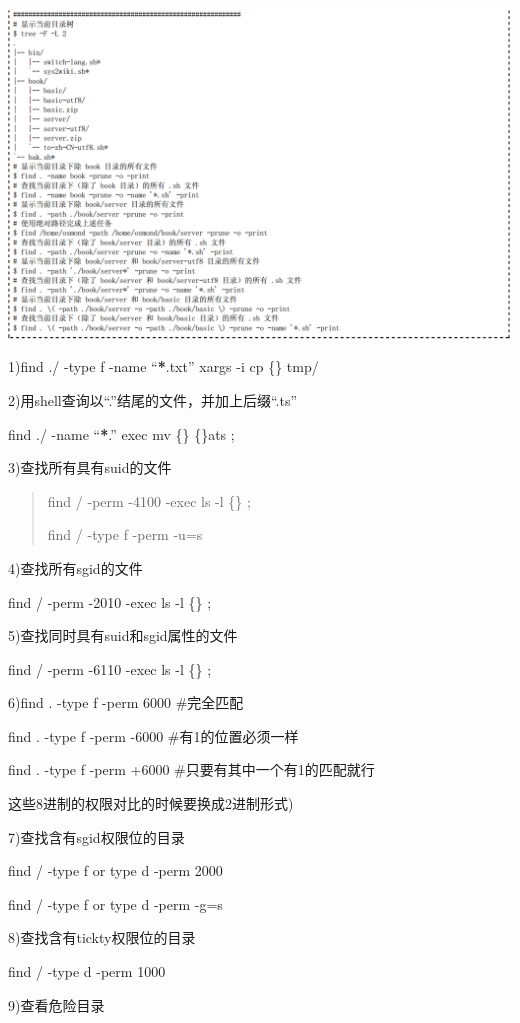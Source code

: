 \documentclass[letterpaper,10pt]{sphinxmanual}
\begin{document}
\includegraphics{eg7.png}

1)find ./ -type f -name ``{\color{red}\bfseries{}*}.txt'' {\color{red}\bfseries{}\textbar{}}xargs -i cp \{\} tmp/

2)用shell查询以“.”结尾的文件，并加上后缀“.ts”

find ./ -name ``{\color{red}\bfseries{}*}.'' exec mv \{\} \{\}ats ;

3)查找所有具有suid的文件
\begin{quote}

find / -perm -4100 -exec ls -l \{\} ;

find / -type f -perm -u=s
\end{quote}

4)查找所有sgid的文件

find / -perm -2010 -exec ls -l \{\} ;

5)查找同时具有suid和sgid属性的文件

find / -perm -6110 -exec ls -l \{\} ;

6)find . -type f -perm 6000   \#完全匹配

find . -type f -perm -6000  \#有1的位置必须一样

find . -type f -perm +6000  \#只要有其中一个有1的匹配就行

这些8进制的权限对比的时候要换成2进制形式)

7)查找含有sgid权限位的目录

find / -type f or type d -perm 2000

find / -type f or type d -perm -g=s

8)查找含有tickty权限位的目录

find / -type d -perm 1000

9)查看危险目录
\end{document}
